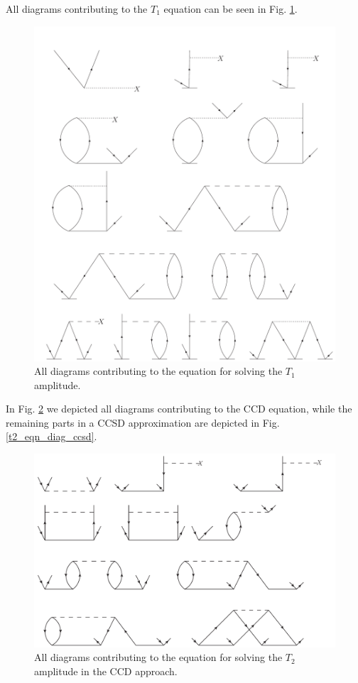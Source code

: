 All diagrams contributing to the $T_1$ equation can be seen in Fig. \ref{t1_eqn_diag}.\\
\begin{figure}[htp]
\centering
\includegraphics[scale=0.25]{t1_eqn_diag}
\caption{All diagrams contributing to the equation for solving the
$T_1$ amplitude.}
\label{t1_eqn_diag}
\end{figure}
In Fig. \ref{t2_eqn_diag} we depicted all diagrams contributing to the CCD equation, while the remaining parts in a CCSD approximation are depicted in 
Fig. \ref{t2_eqn_diag_ccsd}.  
\begin{figure}[htp]
\centering
\includegraphics[scale=0.5]{t2_eqn_diag}%
\caption{All diagrams contributing to the equation for solving the
$T_2$ amplitude in the CCD approach.}
\label{t2_eqn_diag}
\end{figure}
